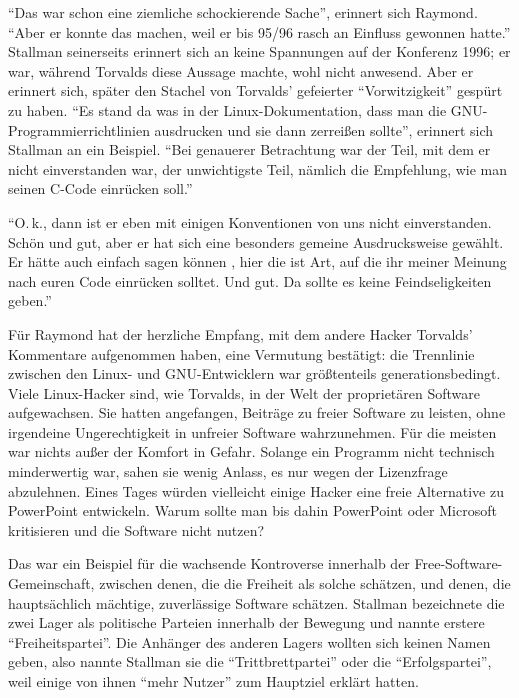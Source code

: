 "`Das war schon eine ziemliche schockierende Sache"', erinnert sich Raymond. "`Aber er konnte das machen, weil er bis 95/96 rasch an Einfluss gewonnen hatte."'
Stallman seinerseits erinnert sich an keine Spannungen auf der Konferenz 1996; er war, während Torvalds diese Aussage machte, wohl nicht anwesend. Aber er erinnert sich, später den Stachel von Torvalds' gefeierter "`Vorwitzigkeit"' gespürt zu haben. "`Es stand da was in der Linux-Dokumentation, dass man die GNU-Programmierrichtlinien ausdrucken und sie dann zerreißen sollte"',\footnotemark{} erinnert sich Stallman an ein Beispiel. "`Bei genauerer Betrachtung war der Teil, mit dem er nicht einverstanden war, der unwichtigste Teil, nämlich die Empfehlung, wie man seinen C-Code einrücken soll."'

"`O.\,k., dann ist er eben mit einigen Konventionen von uns nicht einverstanden. Schön und gut, aber er hat sich eine besonders gemeine Ausdrucksweise gewählt. Er hätte auch einfach sagen können , hier die ist Art, auf die ihr meiner Meinung nach euren Code einrücken solltet.\grq{} Und gut. Da sollte es keine Feindseligkeiten geben."'


Für Raymond hat der herzliche Empfang, mit dem andere Hacker Torvalds' Kommentare aufgenommen haben, eine Vermutung bestätigt: die Trennlinie zwischen den Linux- und GNU-Entwicklern war größtenteils generationsbedingt. Viele Linux-Hacker sind, wie Torvalds, in der Welt der proprietären Software aufgewachsen. Sie hatten angefangen, Beiträge zu freier Software zu leisten, ohne irgendeine Ungerechtigkeit in unfreier Software wahrzunehmen. Für die meisten war nichts außer der Komfort in Gefahr. Solange ein Programm nicht technisch minderwertig war, sahen sie wenig Anlass, es nur wegen der Lizenzfrage abzulehnen. Eines Tages würden vielleicht einige Hacker eine freie Alternative zu PowerPoint entwickeln. Warum sollte man bis dahin PowerPoint oder Microsoft kritisieren und die Software nicht nutzen?

Das war ein Beispiel für die wachsende Kontroverse innerhalb der Free-Software-Gemeinschaft, zwischen denen, die die Freiheit als solche schätzen, und denen, die hauptsächlich mächtige, zuverlässige Software schätzen. Stallman bezeichnete die zwei Lager als politische Parteien innerhalb der Bewegung und nannte erstere "`Freiheitspartei"'. Die Anhänger des anderen Lagers wollten sich keinen Namen geben, also nannte Stallman sie die "`Trittbrettpartei"' oder die "`Erfolgspartei"', weil einige von ihnen "`mehr Nutzer"' zum Hauptziel erklärt hatten.

